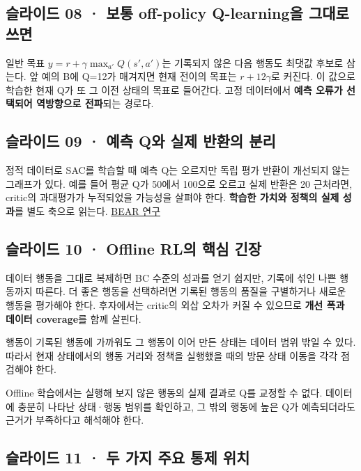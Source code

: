 \documentclass[11pt,a4paper]{article}
\begin{document}
\subsection{슬라이드 08 · 보통 off-policy Q-learning을 그대로 쓰면}

일반 목표 $y=r+\gamma\max_{a'}Q(s',a')$는 기록되지 않은 다음 행동도 최댓값 후보로 삼는다. 앞 예의 B에 Q=12가 매겨지면 현재 전이의 목표는 $r+12\gamma$로 커진다. 이 값으로 학습한 현재 Q가 또 그 이전 상태의 목표로 들어간다. 고정 데이터에서 \textbf{예측 오류가 선택되어 역방향으로 전파}되는 경로다.\par

\subsection{슬라이드 09 · 예측 Q와 실제 반환의 분리}

정적 데이터로 SAC를 학습할 때 예측 Q는 오르지만 독립 평가 반환이 개선되지 않는 그래프가 있다. 예를 들어 평균 Q가 50에서 100으로 오르고 실제 반환은 20 근처라면, critic의 과대평가가 누적되었을 가능성을 살펴야 한다. \textbf{학습한 가치와 정책의 실제 성과}를 별도 축으로 읽는다. \href{https://arxiv.org/abs/1906.00949}{BEAR 연구}\par

\subsection{슬라이드 10 · Offline RL의 핵심 긴장}

데이터 행동을 그대로 복제하면 BC 수준의 성과를 얻기 쉽지만, 기록에 섞인 나쁜 행동까지 따른다. 더 좋은 행동을 선택하려면 기록된 행동의 품질을 구별하거나 새로운 행동을 평가해야 한다. 후자에서는 critic의 외삽 오차가 커질 수 있으므로 \textbf{개선 폭과 데이터 coverage}를 함께 살핀다.\par

행동이 기록된 행동에 가까워도 그 행동이 이어 만든 상태는 데이터 범위 밖일 수 있다. 따라서 현재 상태에서의 행동 거리와 정책을 실행했을 때의 방문 상태 이동을 각각 점검해야 한다.\par

Offline 학습에서는 실행해 보지 않은 행동의 실제 결과로 Q를 교정할 수 없다. 데이터에 충분히 나타난 상태·행동 범위를 확인하고, 그 밖의 행동에 높은 Q가 예측되더라도 근거가 부족하다고 해석해야 한다.\par

\subsection{슬라이드 11 · 두 가지 주요 통제 위치}
\end{document}
